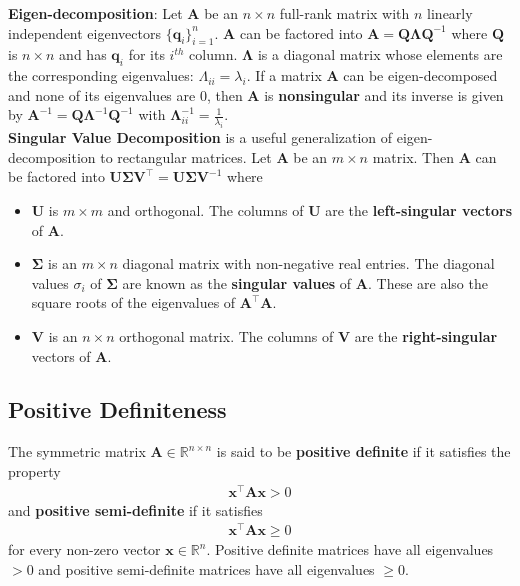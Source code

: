 \documentclass{harvardml}
\theoremstyle{definition}
\theoremstyle{plain}
\newcommand{\R}{\mathbb{R}}
\renewcommand{\v}[1]{\mathbf{#1}}
\begin{document}
		\noindent \textbf{Eigen-decomposition}:
		Let $\v A$ be an $n \times n$ full-rank
		matrix with $n$ linearly independent eigenvectors
		$\{\v q_i\}_{i=1}^n$. $\v A$ can be factored into
		$ \v A = \v Q \v \Lambda \v Q^{-1} $ where $\v Q$
		is $n \times n$ and has $\v q_i$ for its $i^{th}$
		column. $\v \Lambda$ is a diagonal matrix whose elements
		are the corresponding eigenvalues: $\Lambda_{ii} = \lambda_i$.
		If a matrix $\v A$ can be eigen-decomposed and none of its
		eigenvalues are $0$, then $\v A$ is \textbf{nonsingular} and
		its inverse is given by $\v A^{-1} = \v Q \v \Lambda^{-1}
		\v Q^{-1}$ with $\v \Lambda^{-1}_{ii} = \frac{1}{\lambda_i}$.\\

		\noindent \textbf{Singular Value Decomposition} is 
		a useful generalization of eigen-decomposition
		to rectangular matrices. Let $\v A$ be an $m \times n$ matrix. 
		Then $\v A$
		can be factored into $\v U \v \Sigma \v V^\top = 
		\v U \v \Sigma \v V^{-1}$ where
		\begin{itemize}
			\item $\v U$ is $m \times m$ and
		orthogonal. The columns of $\v U$ are
		the \textbf{left-singular vectors} of $\v A$.
			\item $\v \Sigma$ is an $m \times n$ diagonal
		matrix with non-negative real entries. The diagonal
		values $\sigma_i$ of $\v \Sigma$ are known as the
		\textbf{singular values} of $\v A$. These are also
		the square roots of the eigenvalues of $\v A^\top \v A$.
			\item $\v V$ is an $n
		\times n$ orthogonal matrix. The columns of $\v V$ are
		the \textbf{right-singular} vectors of $\v A$.
		\end{itemize}

    \subsection{Positive Definiteness}

        The symmetric matrix $\mathbf{A} \in \R^{n\times n}$ is 
        said to be \textbf{positive definite} if it satisfies the property 
        \begin{align*}
            \mathbf{x}^\top \mathbf{A} \mathbf{x} > 0
        \end{align*}
        and \textbf{positive semi-definite} if it satisfies
        \begin{align*}
            \mathbf{x}^\top \mathbf{A} \mathbf{x} \geq 0
        \end{align*}
        for every non-zero vector $\mathbf{x} \in \R^n$. 
        Positive definite matrices have all eigenvalues $>0$ 
        and positive semi-definite matrices have all eigenvalues $\geq0$.
    
\end{document}
